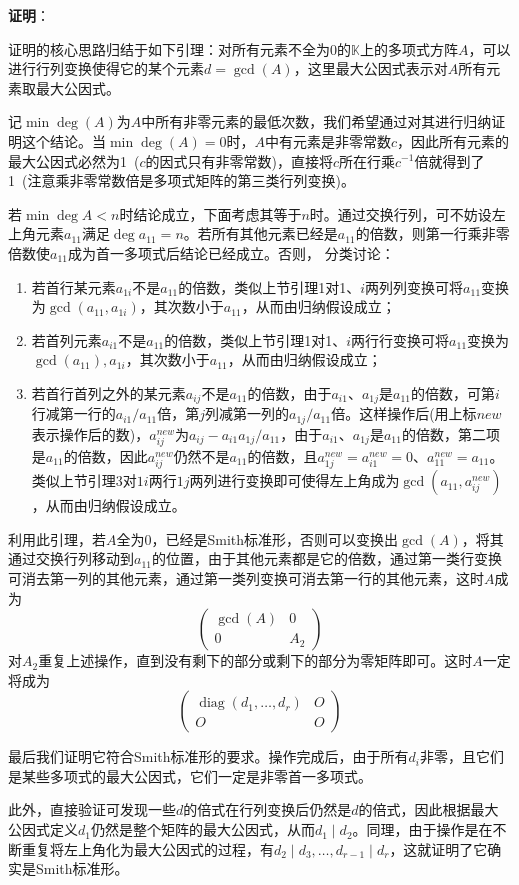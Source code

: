 \documentclass[a4paper,UTF8,fontset=windows,AutoFakeBold]{ctexart}
\DeclareMathOperator{\diag}{diag}
\newcommand{\proo}[1]{{\vspace{5pt}\kaishu\noindent\textbf{证明}：\vspace{-3pt}
\begin{compactitem}
    \item[] #1
\end{compactitem}
}}
\begin{document}
\proo{
    证明的核心思路归结于如下引理：对所有元素不全为0的$\mathbb{K}$上的多项式方阵$A$，可以进行行列变换使得它的某个元素$d=\gcd(A)$，这里最大公因式表示对$A$所有元素取最大公因式。

    记$\min\deg(A)$为$A$中所有非零元素的最低次数，我们希望通过对其进行归纳证明这个结论。当$\min\deg(A)=0$时，$A$中有元素是非零常数$c$，因此所有元素的最大公因式必然为1\ ($c$的因式只有非零常数)，直接将$c$所在行乘$c^{-1}$倍就得到了1\ (注意乘非零常数倍是多项式矩阵的第三类行列变换)。

    若$\min\deg A<n$时结论成立，下面考虑其等于$n$时。通过交换行列，可不妨设左上角元素$a_{11}$满足$\deg a_{11}=n$。若所有其他元素已经是$a_{11}$的倍数，则第一行乘非零倍数使$a_{11}$成为首一多项式后结论已经成立。否则， 分类讨论：
    \begin{enumerate}
        \item 若首行某元素$a_{1i}$不是$a_{11}$的倍数，类似上节引理1对1、$i$两列列变换可将$a_{11}$变换为$\gcd(a_{11},a_{1i})$，其次数小于$a_{11}$，从而由归纳假设成立；
        \item 若首列元素$a_{i1}$不是$a_{11}$的倍数，类似上节引理1对1、$i$两行行变换可将$a_{11}$变换为$\gcd(a_{11}),a_{1i}$，其次数小于$a_{11}$，从而由归纳假设成立；
        \item 若首行首列之外的某元素$a_{ij}$不是$a_{11}$的倍数，由于$a_{i1}$、$a_{1j}$是$a_{11}$的倍数，可第$i$行减第一行的$a_{i1}/a_{11}$倍，第$j$列减第一列的$a_{1j}/a_{11}$倍。这样操作后(用上标$new$表示操作后的数)，$a_{ij}^{new}$为$a_{ij}-a_{i1}a_{1j}/a_{11}$，由于$a_{i1}$、$a_{1j}$是$a_{11}$的倍数，第二项是$a_{11}$的倍数，因此$a_{ij}^{new}$仍然不是$a_{11}$的倍数，且$a_{1j}^{new}=a_{i1}^{new}=0$、$a_{11}^{new}=a_{11}$。类似上节引理3对$1i$两行$1j$两列进行变换即可使得左上角成为$\gcd(a_{11},a_{ij}^{new})$，从而由归纳假设成立。
    \end{enumerate}

    利用此引理，若$A$全为0，已经是Smith标准形，否则可以变换出$\gcd(A)$，将其通过交换行列移动到$a_{11}$的位置，由于其他元素都是它的倍数，通过第一类行变换可消去第一列的其他元素，通过第一类列变换可消去第一行的其他元素，这时$A$成为
    $$\begin{pmatrix}\gcd(A)&0\\0&A_2\end{pmatrix}$$
    对$A_2$重复上述操作，直到没有剩下的部分或剩下的部分为零矩阵即可。这时$A$一定将成为
    $$\begin{pmatrix}\diag(d_1,\dots,d_r)&O\\O&O\end{pmatrix}$$

    最后我们证明它符合Smith标准形的要求。操作完成后，由于所有$d_i$非零，且它们是某些多项式的最大公因式，它们一定是非零首一多项式。

    此外，直接验证可发现一些$d$的倍式在行列变换后仍然是$d$的倍式，因此根据最大公因式定义$d_1$仍然是整个矩阵的最大公因式，从而$d_1\mid d_2$。同理，由于操作是在不断重复将左上角化为最大公因式的过程，有$d_2\mid d_3,\dots,d_{r-1}\mid d_r$，这就证明了它确实是Smith标准形。
}
\end{document}
